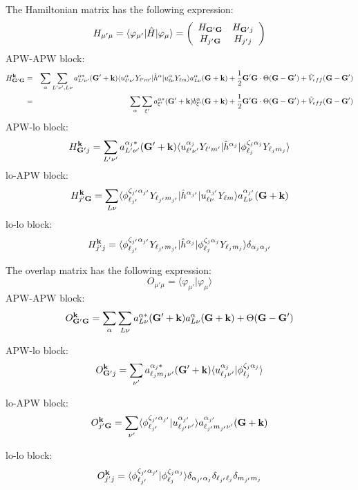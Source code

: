 The Hamiltonian matrix has the following expression\+: \[ H_{\mu' \mu}=\langle \varphi_{\mu' } | \hat H | \varphi_{\mu } \rangle = \left( \begin{array}{cc} H_{\bf G'G} & H_{{\bf G'}j} \\ H_{j'{\bf G}} & H_{j'j} \end{array} \right) \] A\+P\+W-\/\+A\+P\+W block\+: \begin{eqnarray*} H_{{\bf G'} {\bf G}}^{\bf k} &=& \sum_{\alpha} \sum_{L'\nu', L\nu} a_{L'\nu'}^{\alpha *}({\bf G'+k}) \langle u_{\ell' \nu'}^{\alpha}Y_{\ell' m'}|\hat h^{\alpha} | u_{\ell \nu}^{\alpha}Y_{\ell m} \rangle a_{L\nu}^{\alpha}({\bf G+k}) + \frac{1}{2}{\bf G'} {\bf G} \cdot \Theta({\bf G - G'}) + \tilde V_{eff}({\bf G - G'}) \\ &=& \sum_{\alpha} \sum_{\xi' } a_{\xi'}^{\alpha *}({\bf G'+k}) b_{\xi'}^{\alpha}({\bf G+k}) + \frac{1}{2}{\bf G'} {\bf G} \cdot \Theta({\bf G - G'}) + \tilde V_{eff}({\bf G - G'}) \end{eqnarray*} A\+P\+W-\/lo block\+: \[ H_{{\bf G'} j}^{\bf k} = \sum_{L'\nu'} a_{L'\nu'}^{\alpha_j *}({\bf G'+k}) \langle u_{\ell' \nu'}^{\alpha_j}Y_{\ell' m'}|\hat h^{\alpha_j} | \phi_{\ell_j}^{\zeta_j \alpha_j} Y_{\ell_j m_j} \rangle \] lo-\/\+A\+P\+W block\+: \[ H_{j' {\bf G}}^{\bf k} = \sum_{L\nu} \langle \phi_{\ell_{j'}}^{\zeta_{j'} \alpha_{j'}} Y_{\ell_{j'} m_{j'}} |\hat h^{\alpha_{j'}} | u_{\ell \nu}^{\alpha_{j'}}Y_{\ell m} \rangle a_{L\nu}^{\alpha_{j'}}({\bf G+k}) \] lo-\/lo block\+: \[ H_{j' j}^{\bf k} = \langle \phi_{\ell_{j'}}^{\zeta_{j'} \alpha_{j'}} Y_{\ell_{j'} m_{j'}} |\hat h^{\alpha_{j}} | \phi_{\ell_j}^{\zeta_j \alpha_j} Y_{\ell_j m_j} \rangle \delta_{\alpha_j \alpha_{j'}} \]

The overlap matrix has the following expression\+: \[ O_{\mu' \mu} = \langle \varphi_{\mu'} | \varphi_{\mu} \rangle \] A\+P\+W-\/\+A\+P\+W block\+: \[ O_{{\bf G'} {\bf G}}^{\bf k} = \sum_{\alpha} \sum_{L\nu} a_{L\nu}^{\alpha *}({\bf G'+k}) a_{L\nu}^{\alpha}({\bf G+k}) + \Theta({\bf G-G'}) \]

A\+P\+W-\/lo block\+: \[ O_{{\bf G'} j}^{\bf k} = \sum_{\nu'} a_{\ell_j m_j \nu'}^{\alpha_j *}({\bf G'+k}) \langle u_{\ell_j \nu'}^{\alpha_j} | \phi_{\ell_j}^{\zeta_j \alpha_j} \rangle \]

lo-\/\+A\+P\+W block\+: \[ O_{j' {\bf G}}^{\bf k} = \sum_{\nu'} \langle \phi_{\ell_{j'}}^{\zeta_{j'} \alpha_{j'}} | u_{\ell_{j'} \nu'}^{\alpha_{j'}} \rangle a_{\ell_{j'} m_{j'} \nu'}^{\alpha_{j'}}({\bf G+k}) \]

lo-\/lo block\+: \[ O_{j' j}^{\bf k} = \langle \phi_{\ell_{j'}}^{\zeta_{j'} \alpha_{j'}} | \phi_{\ell_{j}}^{\zeta_{j} \alpha_{j}} \rangle \delta_{\alpha_{j'} \alpha_j} \delta_{\ell_{j'} \ell_j} \delta_{m_{j'} m_j} \] \hypertarget{classsirius_1_1_band_ab4cfe30dfeba7b682d664529055b6242}{}
